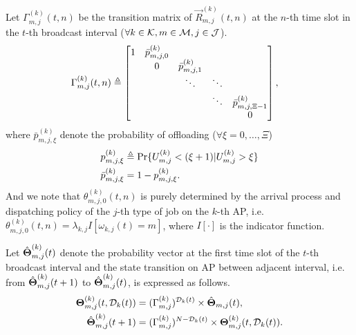 Let ${\Gamma}^{(k)}_{m,j}(t,n)$ be the transition matrix of $\vec{R}^{(k)}_{m,j}(t,n)$ at the $n$-th time slot in the $t$-th broadcast interval ($\forall k\in\mathcal{K}, m\in\mathcal{M}, j\in\mathcal{J}$).
\begin{align}
    \Gamma^{(k)}_{m,j}(t,n) &\triangleq
    \begin{bmatrix}
        1 & \bar{p}^{(k)}_{m,j,0} &                       &        &                           \\
        & 0                     & \bar{p}^{(k)}_{m,j,1} &        &                           \\
        &                       & \ddots                & \ddots &                           \\
        &                       &                       & \ddots & \bar{p}^{(k)}_{m,j,\Xi-1} \\
        &                       &                       &        & 0                         \\
    \end{bmatrix},
\end{align}
where $\bar{p}^{(k)}_{m,j,\xi}$ denote the probability of offloading ($\forall \xi=0,\dots,\Xi$)
\begin{align}
    p^{(k)}_{m,j,\xi} &\triangleq \Pr\{U^{(k)}_{m,j} < (\xi+1) | U^{(k)}_{m,j}>\xi\}
    \\
    \bar{p}^{(k)}_{m,j,\xi} &= 1 - p^{(k)}_{m,j,\xi}.
\end{align}
And we note that $\theta^{(k)}_{m,j,0}(t,n)$ is purely determined by the arrival process and dispatching policy of the $j$-th type of job on the $k$-th AP, i.e. $\theta^{(k)}_{m,j,0}(t,n) = \lambda_{k,j} I[\omega_{k,j}(t) = m]$, where $I[\cdot]$ is the indicator function.

Let $\hat{\boldsymbol{\Theta}}^{(k)}_{m,j}(t)$ denote the probability vector at the first time slot of the $t$-th broadcast interval and the state transition on AP between adjacent interval, i.e. from $\hat{\boldsymbol{\Theta}}^{(k)}_{m,j}(t+1)$ to $\hat{\boldsymbol{\Theta}}^{(k)}_{m,j}(t)$, is expressed as follows.
\begin{align}
    \boldsymbol{\Theta}^{(k)}_{m,j}(t, \mathcal{D}_{k}(t)) &= (\Gamma^{(k)}_{m,j})^{\mathcal{D}_{k}(t)} \times \hat{\boldsymbol{\Theta}}_{m,j}(t),
    \nonumber\\
    \hat{\boldsymbol{\Theta}}^{(k)}_{m,j}(t+1) &= (\Gamma^{(k)}_{m,j})^{N-\mathcal{D}_{k}(t)} \times \boldsymbol{\Theta}^{(k)}_{m,j}(t, \mathcal{D}_{k}(t)).
\end{align}


